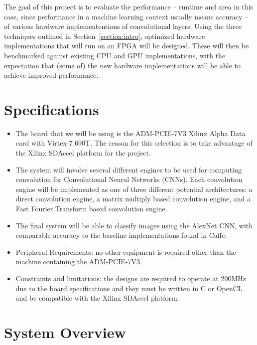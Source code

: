 \documentclass[conference,compsoc]{IEEEtran/IEEEtran}
\begin{document}
The goal of this project is to evaluate the performance -- runtime and area in this case, since performance in a machine learning context usually means accuracy -- of various hardware implemententions of convolutional layers.
Using the three techniques outlined in Section~\ref{section:intro}, optimized hardware implementations that will run on an FPGA will be designed.
These will then be benchmarked against existing CPU and GPU implementations, with the expectation that (some of) the new hardware implementations will be able to achieve improved performance.

\section{Specifications}\label{section:spec}
\begin{itemize}
\item The board that we will be using is the ADM-PCIE-7V3 Xilinx Alpha Data card
with Virtex-7 690T. The reason for this selection is to take advantage of the
Xilinx SDAccel platform for the project.

\item The system will involve several different engines to be used for computing
convolution for Convolutional Neural Networks (CNNs). Each convolution engine
will be implemented as one of three different potential architectures: a direct
convolution engine, a matrix multiply based convolution engine, and a Fast Fourier
Transform based convolution engine.

\item The final system will be able to classify images using the AlexNet CNN, with 
comparable accuracy to the baseline implementations found in Caffe. 

\item Peripheral Requirements: no other equipment is required other than the machine
containing the ADM-PCIE-7V3.

\item Constraints and limitations: the designs are required to operate at 200MHz due
to the board specifications and they must be written in C or OpenCL and be compatible
with the Xilinx SDAccel platform.
\end{itemize}

\section{System Overview}\label{section:overview}
\end{document}
